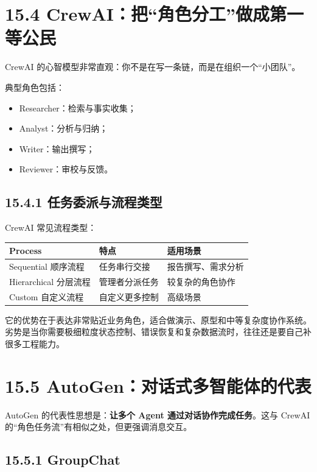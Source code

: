 \section{15.4 CrewAI：把``角色分工''做成第一等公民}

CrewAI 的心智模型非常直观：你不是在写一条链，而是在组织一个``小团队''。


典型角色包括：


\begin{itemize}[leftmargin=2em]
\item Researcher：检索与事实收集；
\item Analyst：分析与归纳；
\item Writer：输出撰写；
\item Reviewer：审校与反馈。
\end{itemize}

\subsection{15.4.1 任务委派与流程类型}

CrewAI 常见流程类型：


\begingroup
\scriptsize
\setlength{\tabcolsep}{3pt}
\begin{longtable}{|p{}|p{}|p{}|}
\hline
Process & 特点 & 适用场景 \\ \hline
Sequential 顺序流程 & 任务串行交接 & 报告撰写、需求分析 \\ \hline
Hierarchical 分层流程 & 管理者分派任务 & 较复杂的角色协作 \\ \hline
Custom 自定义流程 & 自定义更多控制 & 高级场景 \\ \hline
\end{longtable}
\endgroup

它的优势在于表达非常贴近业务角色，适合做演示、原型和中等复杂度协作系统。劣势是当你需要极细粒度状态控制、错误恢复和复杂数据流时，往往还是要自己补很多工程能力。


\section{15.5 AutoGen：对话式多智能体的代表}

AutoGen 的代表性思想是：\textbf{让多个 Agent 通过对话协作完成任务}。这与 CrewAI 的``角色任务流''有相似之处，但更强调消息交互。


\subsection{15.5.1 GroupChat}


